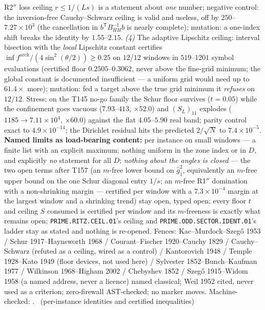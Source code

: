 \documentclass[11pt,a4paper]{article}
\begin{document}
R2$''$ loss ceiling $r\le1/(Ls)$ is a statement about \emph{one} number;
negative control: the inversion-free Cauchy--Schwarz ceiling is valid
and useless, off by $250$--$7.27\times10^{3}$ (the cancellation in
$b^{\mathsf T}B_{HH}^{-1}b$ is nearly complete); mutation: a one-index
shift breaks the identity by $1.55$--$2.15$. \emph{(4)} The adaptive
Lipschitz ceiling: interval bisection with the \emph{local} Lipschitz
constant certifies $\inf f^{\mathrm{arch}}/(4\sin^2(\theta/2))\ge0.25$
on $12/12$ windows in $519$--$1201$ symbol evaluations (certified floor
$0.2505$--$0.3062$, never above the fine-grid minimum; the global
constant is documented insufficient --- a uniform grid would need up to
$61.4\times$ more); mutation: fed a target above the true grid minimum
it \emph{refuses} on $12/12$. Stress: on the T145 no-go family the Schur
floor survives ($t=0.05$) while the confinement goes vacuous
($7.93$--$413$, $\times52.0$) and $(S_L)_{11}$ explodes
($1185\to7.11\times10^{4}$, $\times60.0$) against the flat
$4.05$--$5.90$ real band; parity control exact to $4.9\times10^{-14}$;
the Dirichlet residual hits the predicted $2/\sqrt N$ to
$7.4\times10^{-5}$.
\textbf{Named limits as load-bearing content:} per instance on small
windows --- a finite list with an explicit maximum; nothing uniform in
the zone index or in $D$, and explicitly \emph{no} statement for all
$D$; \emph{nothing about the angles is closed} --- the two open terms
after T157 (an $m$-free lower bound on $\hat g_1^2$, equivalently an
$m$-free upper bound on the one Schur diagonal entry $1/s$; an $m$-free
R1$''$ domination with a non-shrinking margin --- certified per window
with a $7.3\times10^{-4}$ margin at the largest window and a shrinking
trend) stay open, typed open; every floor $t$ and ceiling $S$ consumed
is certified per window and its $m$-freeness is exactly what remains
open; \texttt{PRIME.RITZ.CEIL.01}'s ceiling and
\texttt{PRIME.ODD.SECTOR.IDENT.01}'s ladder stay as stated and nothing
is re-opened. Fences: Kac--Murdock--Szeg\H{o} 1953 / Schur
1917--Haynsworth 1968 / Courant--Fischer 1920--Cauchy 1829 /
Cauchy--Schwarz (refuted as a ceiling, wired as a control) / Kantorovich
1948 / Temple 1928--Kato 1949 (floor devices, not used here) / Sylvester
1852--Bunch--Kaufman 1977 / Wilkinson 1968--Higham 2002 / Chebyshev 1852
/ Szeg\H{o} 1915--Widom 1958 (a named address, never a licence) named
classical; Weil 1952 cited, never used as a criterion; zero-firewall
AST-checked; no marker moves.
Machine-checked: .
\mE\ (per-instance identities and certified inequalities)
\end{document}
